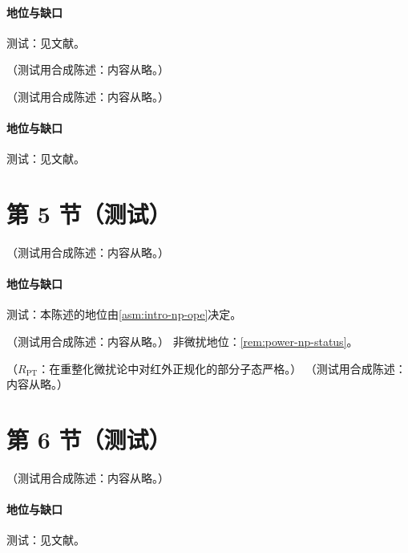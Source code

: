\paragraph{地位与缺口}测试：见文献。

\begin{example}[带 $n$ 个费米子泡的单胶子]\label{ex:power-renormalon-chain}
（测试用合成陈述：内容从略。）
\end{example}

\begin{proposition}\label{prop:power-renormalon-examples}
（测试用合成陈述：内容从略。）
\end{proposition}
\paragraph{地位与缺口}测试：见文献。

\section{第 5 节（测试）}\label{sec:power-renormalons}

\begin{conjecture}\label{conj:power-renormalon-ht}
（测试用合成陈述：内容从略。）
\end{conjecture}
\paragraph{地位与缺口}测试：本陈述的地位由\cref{asm:intro-np-ope}决定。

\begin{remark}[非微扰地位]\label{rem:power-np-status}
（测试用合成陈述：内容从略。）
非微扰地位：\cref{rem:power-np-status}。
\end{remark}

\begin{theorem}\label{thm:power-ope-convergence}
（$R_{\mathrm{PT}}$：在重整化微扰论中对红外正规化的部分子态严格。）
（测试用合成陈述：内容从略。）
\end{theorem}

\section{第 6 节（测试）}\label{sec:power-np}

\begin{proposition}\label{prop:power-thooft-model}
（测试用合成陈述：内容从略。）
\end{proposition}
\paragraph{地位与缺口}测试：见文献。
